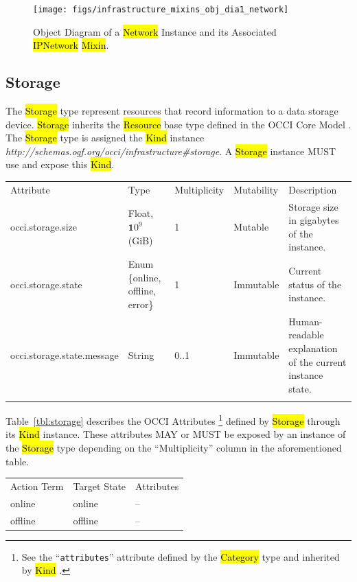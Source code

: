 \documentclass[10pt,a4paper]{article}
\begin{document}
\begin{figure}[!h]
	\centering
	\texttt{[image: figs/infrastructure\_mixins\_obj\_dia1\_network]}
	\caption{Object Diagram of a \hl{Network} Instance and its
	Associated \hl{IPNetwork} \hl{Mixin}.}
	\label{fig:network_mixin}
\end{figure}

\subsection{Storage}
The \hl{Storage} type represent resources that record information to a
data storage device.  \hl{Storage} inherits the \hl{Resource} base
type defined in the OCCI Core Model \cite{occi:core}.  The
\hl{Storage} type is assigned the \hl{Kind} instance
\textit{http://schemas.ogf.org/occi/infrastructure\#storage}.  A
\hl{Storage} instance MUST use and expose this \hl{Kind}.

{
	\begin{tabular}{lp{2.5cm}p{1cm}lp{5cm}}
	\toprule
	Attribute&Type&Multi\-plicity&Mutability&Description\\
	\colrule
	occi.storage.size & Float, ${\mathbf 10}^9$ (GiB) & 1 & Mutable
	& Storage size in gigabytes of the 	instance.\\
	occi.storage.state & Enum \{online, off\-line, error\} & 1 & Immutable
	& Current status of the instance.\\
	occi.storage.state.message & String & 0..1 & Immutable
	& Human-readable explanation of the current instance state.\\
	\botrule
	\end{tabular}
}

Table~\ref{tbl:storage} describes the OCCI Attributes%
\footnote{See the ``{\tt attributes}'' attribute defined by the
  \hl{Category} type and inherited by \hl{Kind} \cite{occi:core}.}
defined by \hl{Storage} through its \hl{Kind} instance. These attributes
MAY or MUST be exposed by an instance of the \hl{Storage} type
depending on the ``Multiplicity'' column in the aforementioned table.

{
	\begin{tabular}{lll}
	\toprule
	Action Term&Target State&Attributes\\
	\colrule
	online & online & --\\
	offline & offline & --\\
	\end{tabular}
}
\end{document}
